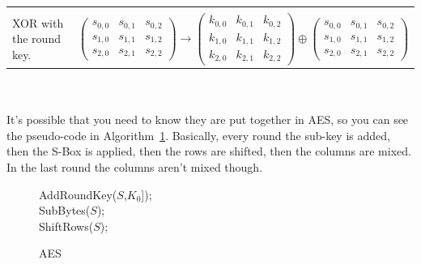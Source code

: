 \begin{tabular}{ll}
        \begin{minipage}[t]{\leftminipagewidth}
            \textbf{Round Key Addition}\\
            XOR with the round key.
        \end{minipage}
        &
        \begin{minipage}[t]{\rightminipagewidth}
        $
            \begin{pmatrix}
                s_{0,0} & s_{0,1} & s_{0,2}\\
                s_{1,0} & s_{1,1} & s_{1,2}\\
                s_{2,0} & s_{2,1} & s_{2,2}
            \end{pmatrix}
            \rightarrow
            \begin{pmatrix}
                k_{0,0} & k_{0,1} & k_{0,2}\\
                k_{1,0} & k_{1,1} & k_{1,2}\\
                k_{2,0} & k_{2,1} & k_{2,2}
            \end{pmatrix}
            \oplus
            \begin{pmatrix}
                s_{0,0} & s_{0,1} & s_{0,2}\\
                s_{1,0} & s_{1,1} & s_{1,2}\\
                s_{2,0} & s_{2,1} & s_{2,2}
            \end{pmatrix}
        $
        \end{minipage}

    \end{tabular}\\\\
    It's possible that you need to know they are put together in AES, so you can see the pseudo-code in Algorithm~\ref{alg:aes}. Basically, every round the sub-key is added, then the S-Box is applied, then the rows are shifted, then the columns are mixed. In the last round the columns aren't mixed though.\\
    \begin{figure}[htp!]
        \centering
        \begin{algorithm}[H]
            \SetAlgoLined
            AddRoundKey($S$,$K_0$]);\\
            SubBytes($S$);\\
            ShiftRows($S$);\\
            \caption{AES}
            \label{alg:aes}
        \end{algorithm}
    \end{figure}
